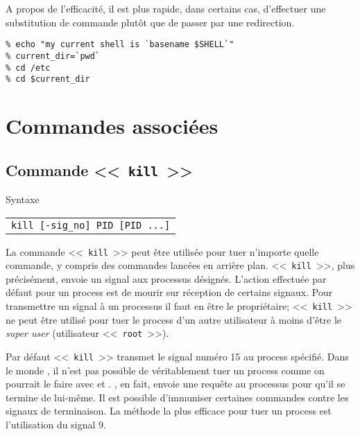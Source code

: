 A propos de l'efficacit{\'e}, il est plus rapide, dans certains cas, d'effectuer une substitution de commande plut{\^o}t que de passer par une redirection.

\begin{example}
\begin{verbatim}
% echo "my current shell is `basename $SHELL`"
% current_dir=`pwd`
% cd /etc
% cd $current_dir
\end{verbatim}
\end{example}

\section{Commandes associ{\'e}es}

\subsection{\texorpdfstring{\label{multi-task-kill}Commande <<~{\tt kill}~>>}{Commande <<~kill~>>}}

\begin{definition}{Syntaxe}
\begin{tabular}{@{\hspace{1cm}}l}
	{\tt kill [-sig\_no] PID [PID ...]}\\[0.2cm]
\end{tabular}
\end{definition}

La commande <<~\texttt{kill}~>> peut {\^e}tre utilis{\'e}e pour tuer n'importe quelle commande, y compris des commandes lanc{\'e}es en arri{\`e}re plan. <<~{\tt kill}~>>, plus pr{\'e}cis{\'e}ment, envoie un signal aux processus d{\'e}sign{\'e}s. L'action effectu{\'e}e par d{\'e}faut pour un process est de mourir sur r{\'e}ception de certains signaux. Pour transmettre un signal {\`a} un processus il faut en {\^e}tre le propri{\'e}taire; <<~{\tt kill}~>> ne peut {\^e}tre utilis{\'e} pour tuer le process d'un autre utilisateur {\`a} moins d'{\^e}tre le {\sl super user} (utilisateur <<~{\tt root}~>>).

Par d{\'e}faut <<~{\tt kill}~>> transmet le signal num{\'e}ro 15 au process sp{\'e}cifi{\'e}.
Dans le monde {\Unix}, il n'est pas possible de v{\'e}ritablement tuer un process comme on pourrait le faire avec {\WindowsNT} et {\OpenVMS}. {\Unix}, en fait, envoie une requ{\^e}te au processus pour qu'il se termine de lui-m{\^e}me. Il est possible d'immuniser certaines commandes contre les signaux de terminaison. La
m{\'e}thode la plus efficace pour tuer un process est l'utilisation du signal 9.


